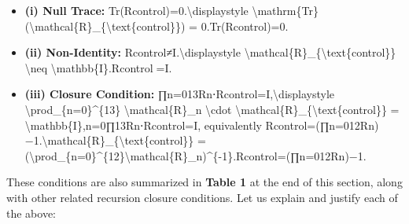 \documentclass[
]{article}
\begin{document}
\begin{itemize}
\item
  \textbf{(i) Null Trace:} Tr(Rcontrol)=0.\textbackslash displaystyle
  \textbackslash mathrm\{Tr\}(\textbackslash mathcal\{R\}\_\{\textbackslash text\{control\}\})
  = 0.Tr(Rcontrol\hspace{0pt})=0.
\item
  \textbf{(ii) Non-Identity:} Rcontrol≠I.\textbackslash displaystyle
  \textbackslash mathcal\{R\}\_\{\textbackslash text\{control\}\}
  \textbackslash neq \textbackslash mathbb\{I\}.Rcontrol\hspace{0pt}=I.
\item
  \textbf{(iii) Closure Condition:}
  ∏n=013Rn⋅Rcontrol=I,\textbackslash displaystyle
  \textbackslash prod\_\{n=0\}\^{}\{13\} \textbackslash mathcal\{R\}\_n
  \textbackslash cdot
  \textbackslash mathcal\{R\}\_\{\textbackslash text\{control\}\} =
  \textbackslash mathbb\{I\},n=0∏13\hspace{0pt}Rn\hspace{0pt}⋅Rcontrol\hspace{0pt}=I,
  equivalently
  Rcontrol=(∏n=012Rn)−1.\textbackslash mathcal\{R\}\_\{\textbackslash text\{control\}\}
  =
  (\textbackslash prod\_\{n=0\}\^{}\{12\}\textbackslash mathcal\{R\}\_n)\^{}\{-1\}.Rcontrol\hspace{0pt}=(∏n=012\hspace{0pt}Rn\hspace{0pt})−1.
\end{itemize}

These conditions are also summarized in \textbf{Table 1} at the end of
this section, along with other related recursion closure conditions. Let
us explain and justify each of the above:
\end{document}
